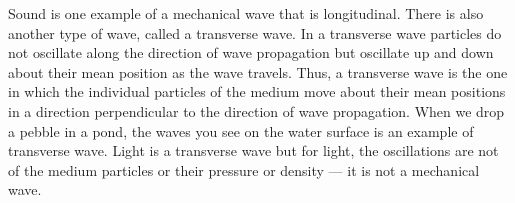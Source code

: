 \documentclass[12pt,a4paper]{tufte-handout}
\begin{document}
Sound is one example of a mechanical wave that is longitudinal. There is also another type of wave, called
a transverse wave. In a transverse wave
particles do not oscillate along the direction
of wave propagation but oscillate up and down
about their mean position as the wave travels.
Thus, a transverse wave is the one in which
the individual particles of the medium move
about their mean positions in a direction
perpendicular to the direction of wave
propagation.
When we drop a pebble in a
pond, the waves you see on the water surface
is an example of transverse wave. Light is a
transverse wave but for light, the oscillations
are not of the medium particles or their
pressure or density — it is not a mechanical
wave. 


\nocite{PhysRevSTPER.6.020114}



\end{document}
